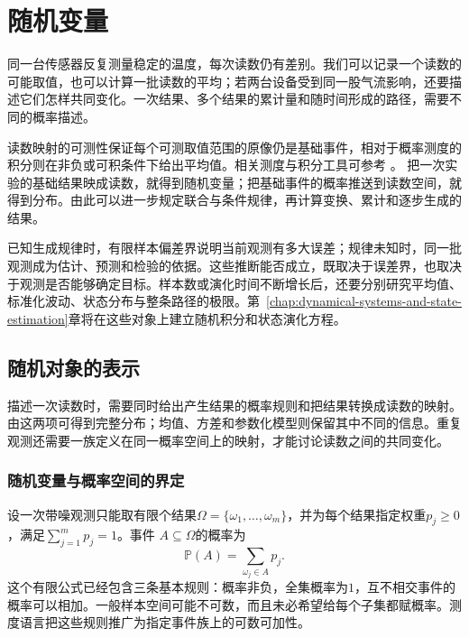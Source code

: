 \chapter{随机变量}
\label{chap:random-variables}
\label{chap:probability-theory}
\label{chap:stochastic-processes-and-approximation}
\label{chap:mathematical-statistics}

同一台传感器反复测量稳定的温度，每次读数仍有差别。我们可以记录一个读数的可能取值，也可以计算一批读数的平均；若两台设备受到同一股气流影响，还要描述它们怎样共同变化。一次结果、多个结果的累计量和随时间形成的路径，需要不同的概率描述。

读数映射的可测性保证每个可测取值范围的原像仍是基础事件，相对于概率测度的积分则在非负或可积条件下给出平均值。相关测度与积分工具可参考
。
把一次实验的基础结果映成读数，就得到随机变量；把基础事件的概率推送到读数空间，就得到分布。由此可以进一步规定联合与条件规律，再计算变换、累计和逐步生成的结果。

已知生成规律时，有限样本偏差界说明当前观测有多大误差；规律未知时，同一批观测成为估计、预测和检验的依据。这些推断能否成立，既取决于误差界，也取决于观测是否能够确定目标。样本数或演化时间不断增长后，还要分别研究平均值、标准化波动、状态分布与整条路径的极限。第~\ref{chap:dynamical-systems-and-state-estimation}章将在这些对象上建立随机积分和状态演化方程。

\section{随机对象的表示}
\label{sec:rv-definition}
\label{sec:probability-representation-conditioning}
描述一次读数时，需要同时给出产生结果的概率规则和把结果转换成读数的映射。由这两项可得到完整分布；均值、方差和参数化模型则保留其中不同的信息。重复观测还需要一族定义在同一概率空间上的映射，才能讨论读数之间的共同变化。

\subsection{随机变量与概率空间的界定}
\label{sec:probability-spaces-random-variables}
设一次带噪观测只能取有限个结果\(\Omega=\{\omega_1,\ldots,\omega_m\}\)，并为每个结果指定权重\(p_j\geq0\)，满足\(\sum_{j=1}^{m}p_j=1\)。事件
\(A\subseteq\Omega\)的概率为
\[ \mathbb{P}(A)=\sum_{\omega_j\in A}p_j. \]
这个有限公式已经包含三条基本规则：概率非负，全集概率为\(1\)，互不相交事件的概率可以相加。一般样本空间可能不可数，而且未必希望给每个子集都赋概率。测度语言把这些规则推广为指定事件族上的可数可加性。

